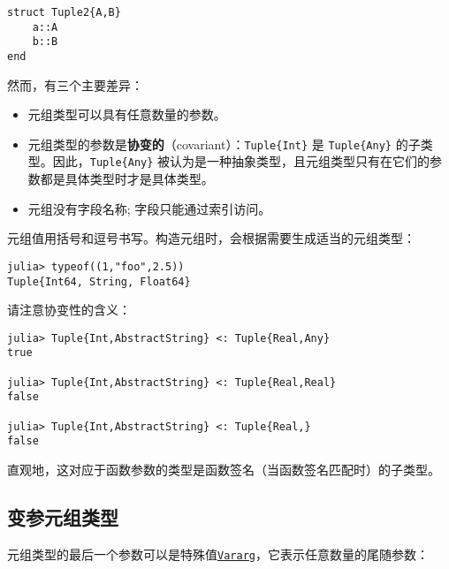 \begin{verbatim}
struct Tuple2{A,B}
    a::A
    b::B
end
\end{verbatim}



然而，有三个主要差异：



\begin{itemize}
\item 元组类型可以具有任意数量的参数。


\item 元组类型的参数是\textbf{协变的}（covariant）：\texttt{Tuple\{Int\}} 是 \texttt{Tuple\{Any\}} 的子类型。因此，\texttt{Tuple\{Any\}} 被认为是一种抽象类型，且元组类型只有在它们的参数都是具体类型时才是具体类型。


\item 元组没有字段名称; 字段只能通过索引访问。

\end{itemize}


元组值用括号和逗号书写。构造元组时，会根据需要生成适当的元组类型：




\begin{verbatim}
julia> typeof((1,"foo",2.5))
Tuple{Int64, String, Float64}
\end{verbatim}



请注意协变性的含义：




\begin{verbatim}
julia> Tuple{Int,AbstractString} <: Tuple{Real,Any}
true

julia> Tuple{Int,AbstractString} <: Tuple{Real,Real}
false

julia> Tuple{Int,AbstractString} <: Tuple{Real,}
false
\end{verbatim}



直观地，这对应于函数参数的类型是函数签名（当函数签名匹配时）的子类型。



\hypertarget{5746534767732668628}{}


\subsection{变参元组类型}



元组类型的最后一个参数可以是特殊值\hyperlink{5941806424098279588}{\texttt{Vararg}}，它表示任意数量的尾随参数：  




